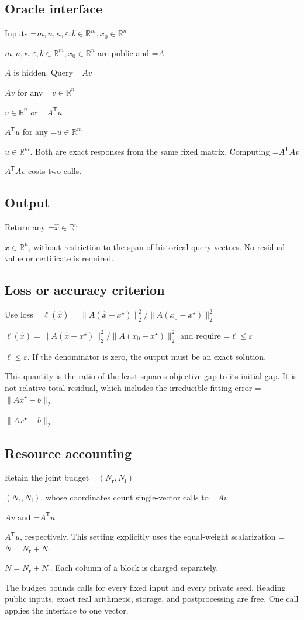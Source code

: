 \documentclass[10pt,a4paper]{article}
\newcommand{\AtlasMath}[1]{\par\begingroup\centering\setbox0=\hbox{$\displaystyle #1$}\ifdim\wd0>1.4\linewidth\typeout{ATLAS WIDE FORMULA: \the\wd0}\fi\ifdim\wd0>\linewidth\resizebox{\linewidth}{!}{\box0}\else\box0\fi\par\endgroup}
\newcommand{\AtlasInlineMath}[1]{\begingroup\setbox0=\hbox{$#1$}\ifdim\wd0>.4\linewidth\endgroup\AtlasMath{#1}\else\endgroup$#1$\fi}
\begin{document}
\subsection{Oracle interface}
Inputs \AtlasInlineMath{m,n,\kappa,\varepsilon,b\in\mathbb{R}^m,x_0\in\mathbb{R}^n} are public and \AtlasInlineMath{A} is hidden. Query \AtlasInlineMath{Av} for any \AtlasInlineMath{v\in\mathbb{R}^n} or \AtlasInlineMath{A^{\mathsf T}u} for any \AtlasInlineMath{u\in\mathbb{R}^m}. Both are exact responses from the same fixed matrix. Computing \AtlasInlineMath{A^{\mathsf T}Av} costs two calls.

\subsection{Output}
Return any \AtlasInlineMath{\widehat x\in\mathbb R^n}, without restriction to the span of historical query vectors. No residual value or certificate is required.

\subsection{Loss or accuracy criterion}
Use loss \AtlasInlineMath{\ell(\widehat{x})=\|A(\widehat{x}-x^\star)\|_2^2/\|A(x_0-x^\star)\|_2^2} and require \AtlasInlineMath{\ell\le\varepsilon}. If the denominator is zero, the output must be an exact solution.

This quantity is the ratio of the least-squares objective gap to its initial gap. It is not relative total residual, which includes the irreducible fitting error \AtlasInlineMath{\|Ax^\star-b\|_2}.

\subsection{Resource accounting}
Retain the joint budget \AtlasInlineMath{(N_{\mathrm{r}},N_{\mathrm{l}})}, whose coordinates count single-vector calls to \AtlasInlineMath{Av} and \AtlasInlineMath{A^{\mathsf T}u}, respectively. This setting explicitly uses the equal-weight scalarization \AtlasInlineMath{N=N_{\mathrm{r}}+N_{\mathrm{l}}}. Each column of a block is charged separately.

The budget bounds calls for every fixed input and every private seed. Reading public inputs, exact real arithmetic, storage, and postprocessing are free. One call applies the interface to one vector.
\end{document}
